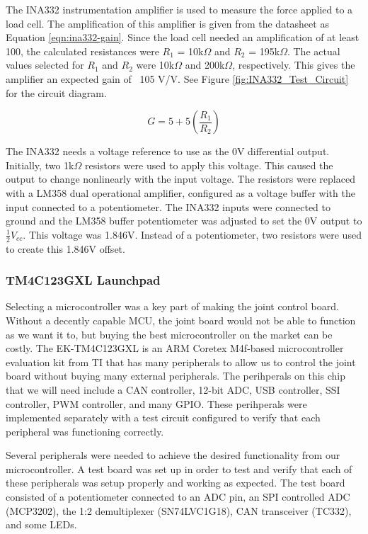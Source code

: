 \noindent The INA332 instrumentation amplifier is used to measure the force applied to a load cell. The amplification of this amplifier is given from the datasheet as Equation \ref{eqn:ina332-gain}. Since the load cell needed an amplification of at least 100, the calculated resistances were $R_1$ = 10k$\Omega$ and $R_2$ = 195k$\Omega$. The actual values selected for $R_1$ and $R_2$ were 10k$\Omega$ and 200k$\Omega$, respectively. This gives the amplifier an expected gain of ~105 V/V. See Figure \ref{fig:INA332_Test_Circuit} for the circuit diagram.

\begin{equation}
G = 5 + 5(\frac{R_1}{R_2})
\label{eqn:ina332-gain}
\end{equation}

\noindent The INA332 needs a voltage reference to use as the 0V differential output. Initially, two 1k$\Omega$ resistors were used to apply this voltage. This caused the output to change nonlinearly with the input voltage. The resistors were replaced with a LM358 dual operational amplifier, configured as a voltage buffer with the input connected to a potentiometer. The INA332 inputs were connected to ground and the LM358 buffer potentiometer was adjusted to set the 0V output to  $\frac{1}{2} V_{cc}$. This voltage was 1.846V. Instead of a potentiometer, two resistors were used to create this 1.846V offset.

\subsubsection{TM4C123GXL Launchpad}
Selecting a microcontroller was a key part of making the joint control board. Without a decently capable MCU, the joint board would not be able to function as we want it to, but buying the best microcontroller on the market can be costly. The EK-TM4C123GXL is an ARM Coretex M4f-based microcontroller evaluation kit from TI that has many peripherals to allow us to control the joint board without buying many external peripherals. The perihperals on this chip that we will need include a CAN controller, 12-bit ADC, USB controller, SSI controller, PWM controller, and many GPIO. These perihperals were implemented separately with a test circuit configured to verify that each peripheral was functioning correctly.

\noindent Several peripherals were needed to achieve the desired functionality from our microcontroller. A test board was set up in order to test and verify that each of these peripherals was setup properly and working as expected. The test board consisted of a potentiometer connected to an ADC pin, an SPI controlled ADC (MCP3202), the 1:2 demultiplexer (SN74LVC1G18), CAN transceiver (TC332), and some LEDs.

